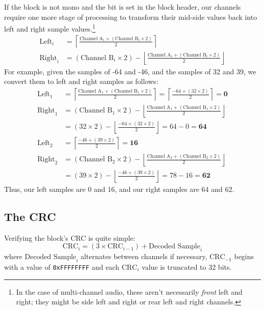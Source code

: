 If the block is not mono and the  bit is set
in the block header, our channels require one more stage of processing
to transform their mid-side values back into left and right sample
values.\footnote{In the case of multi-channel audio, these aren't
necessarily \textit{front} left and right; they might be
side left and right or rear left and right channels.}
\begin{align*}
\text{Left}_i &= \left\lceil\frac{\text{Channel A}_i + (\text{Channel B}_i \times 2)}{2}\right\rceil \\
\text{Right}_i &= (\text{Channel B}_i \times 2) - \left\lfloor\frac{\text{Channel A}_i + (\text{Channel B}_i \times 2)}{2}\right\rfloor
\end{align*}
For example, given the  samples of -64 and -46, and the
 samples of 32 and 39, we convert them to left
and right samples as follows:
\begin{align*}
\text{Left}_1 &= \left\lceil\frac{\text{Channel A}_1 + (\text{Channel B}_1 \times 2)}{2}\right\rceil = \left\lceil\frac{-64 + (32 \times 2)}{2}\right\rceil = \textbf{0} \\
\text{Right}_1 &= (\text{Channel B}_1 \times 2) - \left\lfloor\frac{\text{Channel A}_1 + (\text{Channel B}_1 \times 2)}{2}\right\rfloor \\
&= (32 \times 2) - \left\lfloor\frac{-64 + (32 \times 2)}{2}\right\rfloor = 64 - 0 = \textbf{64} \\
\text{Left}_2 &= \left\lceil\frac{-46 + (39 \times 2)}{2}\right\rceil = \textbf{16} \\
\text{Right}_2 &= (\text{Channel B}_2 \times 2) - \left\lfloor\frac{\text{Channel A}_2 + (\text{Channel B}_2 \times 2)}{2}\right\rfloor \\
&= (39 \times 2) - \left\lfloor\frac{-46 + (39 \times 2)}{2}\right\rfloor = 78 - 16 = \textbf{62}
\end{align*}
Thus, our left samples are 0 and 16, and our right samples are 64 and 62.

\subsection{The CRC}

Verifying the block's CRC is quite simple:
\begin{equation*}
\text{CRC}_i = (3 \times \text{CRC}_{i - 1}) + \text{Decoded Sample}_i
\end{equation*}
where $\text{Decoded Sample}_i$ alternates between channels if necessary,
$\text{CRC}_{-1}$ begins with a value of \texttt{0xFFFFFFFF}
and each $\text{CRC}_i$ value is truncated to 32 bits.

